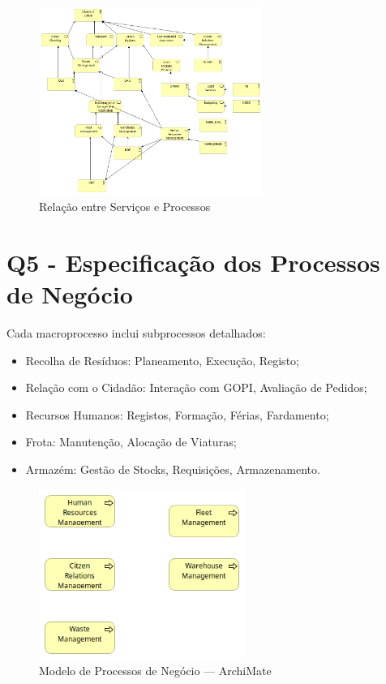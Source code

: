 \documentclass[12pt,a4paper,final]{article}
\begin{document}
    \begin{figure}[H]
        \centering
        \includegraphics[width=0.65\textwidth]{Q4 - Relation Between Business services and Business Processes}
        \caption{Relação entre Serviços e Processos}
        \label{fig:4}
    \end{figure}

    \section*{Q5 - Especificação dos Processos de Negócio}\label{sec:especificacao-dos-processos-de-negocio}
    Cada macroprocesso inclui subprocessos detalhados:
    \begin{itemize}
        \item Recolha de Resíduos: Planeamento, Execução, Registo;
        \item Relação com o Cidadão: Interação com GOPI, Avaliação de Pedidos;
        \item Recursos Humanos: Registos, Formação, Férias, Fardamento;
        \item Frota: Manutenção, Alocação de Viaturas;
        \item Armazém: Gestão de Stocks, Requisições, Armazenamento.
    \end{itemize}

    \begin{figure}[H]
        \centering
        \includegraphics[width=0.6\textwidth]{Q5 - High Level Specification of Business Process}
        \caption{Modelo de Processos de Negócio — ArchiMate}
        \label{fig:5}
    \end{figure}
\end{document}
